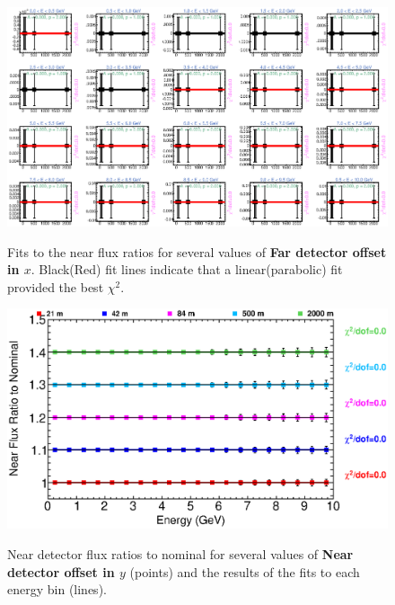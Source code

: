 \begin{figure}[ht]
  \begin{center}
    {\includegraphics[width=5.0in]{figures/LBNEFDX_near_fits.eps}}
  \end{center}
\caption{ Fits to the near flux ratios for several values of {\bf Far detector offset in $x$}. Black(Red) fit lines indicate that a linear(parabolic) fit provided the best $\chi^2$. }
\end{figure}

\begin{figure}[ht]
  \begin{center}
    {\includegraphics[width=6.0in]{figures/LBNEFDY_near_summary.eps}}
  \end{center}
\caption{ Near detector flux ratios to nominal for several values of {\bf Near detector offset in $y$} (points) and the results of the fits to each energy bin (lines).}
\end{figure}

